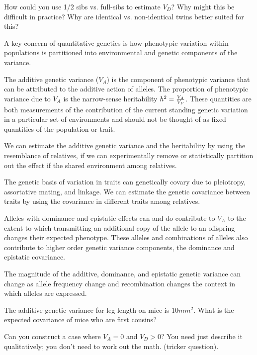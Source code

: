 \begin{question}{}
How could you use 1/2 sibs vs. full-sibs to estimate $V_D$? Why might
this be difficult in practice? Why are identical vs. non-identical
twins better suited for this? 
\end{question}

\begin{ChapterSummary}
  \item A key concern of quantitative genetics is how phenotypic variation within
    populations is  partitioned into environmental and genetic
    components of the variance.
  \item The additive genetic variance ($V_A$) is the component of phenotypic
    variance that can be attributed to the additive action of
    alleles.  The proportion of phenotypic variance due to $V_A$ is the narrow-sense
    heritability $h^2 = \nicefrac{V_A}{V_P}$. These quantities are both
    measurements of the contribution of the current standing genetic variation in a
    particular set of environments and should not be thought of as
    fixed quantities of the population or trait. 
\item We can estimate the additive genetic variance and the
  heritability by using the resemblance of relatives, if we can
  experimentally remove or statistically partition out the effect if the shared environment among relatives. 
  \item The genetic basis of variation in traits can genetically covary due to pleiotropy, assortative
    mating, and linkage. We can estimate the genetic covariance
    between traits by using the covariance in different traits among
    relatives.
    \item Alleles with dominance and epistatic effects can
      and do contribute to $V_A$ to the extent to which transmitting
      an additional copy of the allele to an offspring changes their
      expected phenotype. These alleles and combinations of alleles also contribute to higher order
      genetic variance components, the dominance and epistatic
      covariance.
      \item The magnitude of the additive, dominance, and epistatic genetic variance can
      change as allele frequency change and recombination changes the
      context in which alleles are expressed. 
\end{ChapterSummary}
  
\begin{question}{}
The additive genetic variance for leg length on mice is $10mm^2$. What
is the expected covariance of mice who are first cousins?
\end{question}
\begin{question}{}
Can you construct a case where $V_A=0$ and $V_D>0$? You need
just describe it qualitatively; you don't need to work out the
math. (tricker question). %
\end{question}

